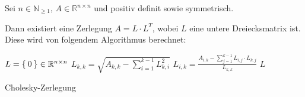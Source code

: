 \documentclass{article}
\begin{document}
\begin{preview}
    Sei $n \in \mathbb{N}_{\geq 1}$, $A \in \mathbb{R}^{n \times n}$ und 
    positiv definit sowie symmetrisch.

    Dann existiert eine Zerlegung $A = L \cdot L^T$, wobei $L$ eine
    untere Dreiecksmatrix ist. Diese wird von folgendem Algorithmus 
    berechnet:

    \begin{algorithm}[H]
        \begin{algorithmic}
                \State $L = \Set{0} \in \mathbb{R}^{n \times n}$ 
                    \State $L_{k,k} = \sqrt{A_{k,k} - \sum_{i=1}^{k-1} L_{k,i}^2}$
                        \State $L_{i,k} = \frac{A_{i,k} - \sum_{j=1}^{k-1} L_{i,j} \cdot L_{k,j}}{L_{k,k}}$
                    \EndFor
                \EndFor
                \State \Return $L$
            \EndFunction
        \end{algorithmic}
    \caption{Cholesky-Zerlegung}
    \label{alg:seq1}
    \end{algorithm}
\end{preview}
\end{document}
